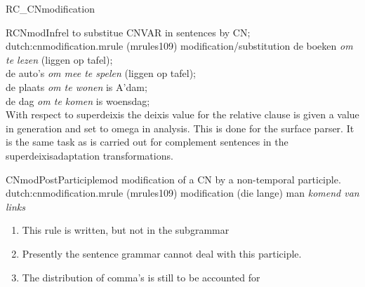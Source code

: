 \begin{mruleclass}{RC\_CNmodification}
\begin{members}
\begin{member}
 RCNmodInfrel
 to substitue CNVAR in sentences by CN; 
\file dutch:cnmodification.mrule (mrules109)
\semantics modification/substitution
\example  
de boeken {\em om te lezen} (liggen op tafel);\\
de auto's {\em om mee te spelen} (liggen op tafel);\\
de plaats {\em om te wonen} is A'dam;\\
de dag {\em om te komen} is woensdag;\\
\remarks
With respect to superdeixis the deixis value for the relative clause is given a value in 
generation and set to omega in analysis. This is done for the surface parser. 
It is the same task as is carried out for complement sentences in the 
superdeixisadaptation transformations.
\end{member}

\begin{member}
 CNmodPostParticiplemod
 modification of a CN by a non-temporal participle.
\file dutch:cnmodification.mrule (mrules109)
\semantics modification
\example (die lange) man {\em komend van links}
\remarks\mbox{}
\begin{enumerate} 
  \item This rule is written, but not in the subgrammar
\item Presently the sentence grammar  cannot deal with this participle.
  \item The distribution of comma's is still to be accounted for
\end{enumerate}


\end{member}
\end{members}
\end{mruleclass}


